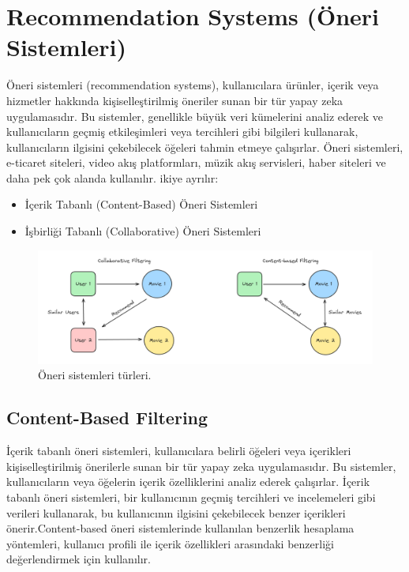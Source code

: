 \section{Recommendation Systems (Öneri Sistemleri)}
Öneri sistemleri (recommendation systems), kullanıcılara ürünler, içerik veya hizmetler hakkında kişiselleştirilmiş öneriler sunan bir tür yapay zeka uygulamasıdır. Bu sistemler, genellikle büyük veri kümelerini analiz ederek ve kullanıcıların geçmiş etkileşimleri veya tercihleri gibi bilgileri kullanarak, kullanıcıların ilgisini çekebilecek öğeleri tahmin etmeye çalışırlar. Öneri sistemleri, e-ticaret siteleri, video akış platformları, müzik akış servisleri, haber siteleri ve daha pek çok alanda kullanılır. ikiye ayrılır:

\begin{itemize}
    \item İçerik Tabanlı (Content-Based) Öneri Sistemleri
    \item İşbirliği Tabanlı (Collaborative) Öneri Sistemleri
\end{itemize}

\begin{figure}[h]
    \centering
    \includegraphics[width=1\textwidth]{images/filtering_types.png}
    \caption{Öneri sistemleri türleri.}
    \label{fig:enter-label}
\end{figure}

\subsection{Content-Based Filtering}
İçerik tabanlı öneri sistemleri, kullanıcılara belirli öğeleri veya içerikleri kişiselleştirilmiş önerilerle sunan bir tür yapay zeka uygulamasıdır. Bu sistemler, kullanıcıların veya öğelerin içerik özelliklerini analiz ederek çalışırlar. İçerik tabanlı öneri sistemleri, bir kullanıcının geçmiş tercihleri ve incelemeleri gibi verileri kullanarak, bu kullanıcının ilgisini çekebilecek benzer içerikleri önerir.Content-based öneri sistemlerinde kullanılan benzerlik hesaplama yöntemleri, kullanıcı profili ile içerik özellikleri arasındaki benzerliği değerlendirmek için kullanılır.\\

